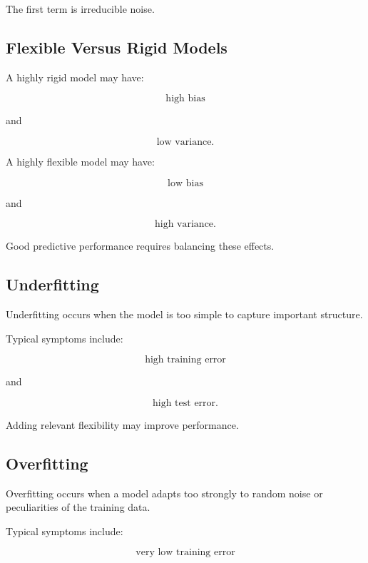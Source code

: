 The first term is irreducible noise.

\subsection{Flexible Versus Rigid Models}
\label{subsec:flexible-versus-rigid}

A highly rigid model may have:

\[
\boxed{
\text{high bias}
}
\]

and

\[
\boxed{
\text{low variance}.
}
\]

A highly flexible model may have:

\[
\boxed{
\text{low bias}
}
\]

and

\[
\boxed{
\text{high variance}.
}
\]

Good predictive performance requires balancing these effects.

\subsection{Underfitting}
\label{subsec:underfitting}

Underfitting occurs when the model is too simple to capture important
structure.

Typical symptoms include:

\[
\boxed{
\text{high training error}
}
\]

and

\[
\boxed{
\text{high test error}.
}
\]

Adding relevant flexibility may improve performance.

\subsection{Overfitting}
\label{subsec:overfitting}

Overfitting occurs when a model adapts too strongly to random noise or
peculiarities of the training data.

Typical symptoms include:

\[
\boxed{
\text{very low training error}
}
\]

